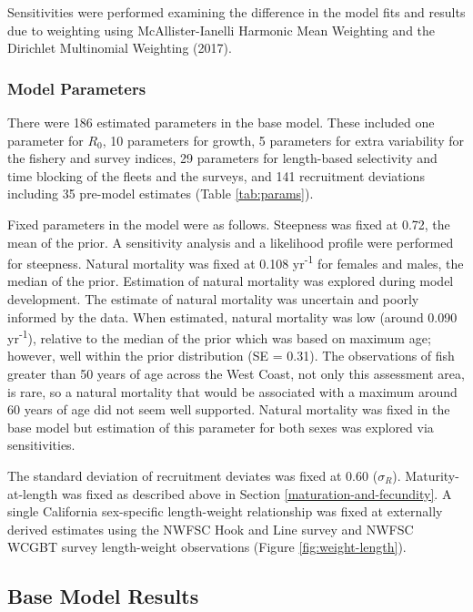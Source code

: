 \documentclass[11pt,
  english,
  letterpaper,
]{article}
\begin{document}
Sensitivities were performed examining the difference in the model fits and results due to weighting using McAllister-Ianelli Harmonic Mean Weighting and the Dirichlet Multinomial Weighting (2017).

\hypertarget{model-parameters}{%
\subsubsection{Model Parameters}\label{model-parameters}}

There were 186 estimated parameters in the base model. These included one parameter for \(R_0\), 10 parameters for growth, 5 parameters for extra variability for the fishery and survey indices, 29 parameters for length-based selectivity and time blocking of the fleets and the surveys, and 141 recruitment deviations including 35 pre-model estimates (Table \ref{tab:params}).

Fixed parameters in the model were as follows. Steepness was fixed at 0.72, the mean of the prior. A sensitivity analysis and a likelihood profile were performed for steepness. Natural mortality was fixed at 0.108 yr\textsuperscript{-1} for females and males, the median of the prior. Estimation of natural mortality was explored during model development. The estimate of natural mortality was uncertain and poorly informed by the data. When estimated, natural mortality was low (around 0.090 yr\textsuperscript{-1}), relative to the median of the prior which was based on maximum age; however, well within the prior distribution (SE = 0.31). The observations of fish greater than 50 years of age across the West Coast, not only this assessment area, is rare, so a natural mortality that would be associated with a maximum around 60 years of age did not seem well supported. Natural mortality was fixed in the base model but estimation of this parameter for both sexes was explored via sensitivities.

The standard deviation of recruitment deviates was fixed at 0.60 (\(\sigma_R\)). Maturity-at-length was fixed as described above in Section \ref{maturation-and-fecundity}. A single California sex-specific length-weight relationship was fixed at externally derived estimates using the NWFSC Hook and Line survey and NWFSC WCGBT survey length-weight observations (Figure \ref{fig:weight-length}).

\hypertarget{base-model-results}{%
\subsection{Base Model Results}\label{base-model-results}}
\end{document}
